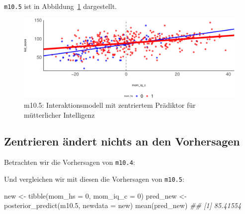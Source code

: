 \documentclass[
  a4paper,
  DIV=11]{scrreprt}
\newenvironment{Shaded}{\begin{snugshade}}{\end{snugshade}}
\newcommand{\AttributeTok}[1]{\textcolor[rgb]{0.40,0.45,0.13}{#1}}
\newcommand{\DecValTok}[1]{\textcolor[rgb]{0.68,0.00,0.00}{#1}}
\newcommand{\DocumentationTok}[1]{\textcolor[rgb]{0.37,0.37,0.37}{\textit{#1}}}
\newcommand{\FloatTok}[1]{\textcolor[rgb]{0.68,0.00,0.00}{#1}}
\newcommand{\FunctionTok}[1]{\textcolor[rgb]{0.28,0.35,0.67}{#1}}
\newcommand{\NormalTok}[1]{\textcolor[rgb]{0.00,0.23,0.31}{#1}}
\newcommand{\OtherTok}[1]{\textcolor[rgb]{0.00,0.23,0.31}{#1}}
\newcommand{\SpecialCharTok}[1]{\textcolor[rgb]{0.37,0.37,0.37}{#1}}
\theoremstyle{definition}
\theoremstyle{remark}
\begin{document}
\texttt{m10.5} ist in Abbildung~\ref{fig-m105} dargestellt.

\begin{figure}

{\centering \includegraphics{./metrische-AV_files/figure-pdf/fig-m105-1.pdf}

}

\caption{\label{fig-m105}m10.5: Interaktionsmodell mit zentriertem
Prädiktor für mütterlicher Intelligenz}

\end{figure}

\hypertarget{zentrieren-uxe4ndert-nichts-an-den-vorhersagen}{%
\subsection{Zentrieren ändert nichts an den
Vorhersagen}\label{zentrieren-uxe4ndert-nichts-an-den-vorhersagen}}

Betrachten wir die Vorhersagen von \texttt{m10.4}:

\begin{Shaded}
\end{Shaded}

Und vergleichen wir mit diesen die Vorhersagen von \texttt{m10.5}:

\begin{Shaded}
\begin{Highlighting}[]
\NormalTok{new }\OtherTok{\textless{}{-}} \FunctionTok{tibble}\NormalTok{(}\AttributeTok{mom\_hs =} \DecValTok{0}\NormalTok{, }\AttributeTok{mom\_iq\_c =} \DecValTok{0}\NormalTok{)}
\NormalTok{pred\_new }\OtherTok{\textless{}{-}} \FunctionTok{posterior\_predict}\NormalTok{(m10}\FloatTok{.5}\NormalTok{, }\AttributeTok{newdata =}\NormalTok{ new)}
\FunctionTok{mean}\NormalTok{(pred\_new)}
\DocumentationTok{\#\# [1] 85.41554}
\end{Highlighting}
\end{Shaded}
\end{document}
